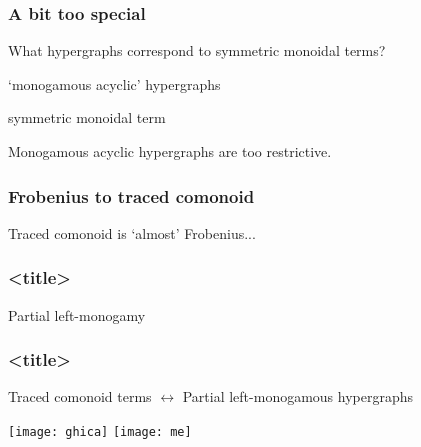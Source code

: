 \begin{frame}
    \frametitle{A bit too special}

    \centering

    What hypergraphs correspond to \alert{symmetric monoidal} terms?

    \vspace{1em}

    \begin{minipage}{0.45\textwidth}
        \begin{center}
            `monogamous acyclic' hypergraphs

            \vspace{1em}

        \end{center}
    \end{minipage}
    \quad
    \raisebox{-1em}{\(\leftrightarrow\)}
    \pause
    \begin{minipage}{0.45\textwidth}
        \begin{center}
            symmetric monoidal term

            \vspace{1em}

        \end{center}
    \end{minipage}

    \vspace{1em}
    \pause
    \normalsize
    \scalebox{0.75}{\hypergraphpeople}

    \vspace{0.5em}
    \Large
    \pause

    Monogamous acyclic hypergraphs are \alert{too restrictive}.

\end{frame}

\begin{frame}
    \frametitle{Frobenius to traced comonoid}

    \centering
    \LARGE
    Traced comonoid is `almost' Frobenius...


\end{frame}

\begin{frame}
    \frametitle{<title>}

    Partial left-monogamy

\end{frame}

\begin{frame}
    \frametitle{<title>}

    Traced comonoid terms
    \(\leftrightarrow\)
    Partial left-monogamous hypergraphs

    \texttt{[image: ghica]}
    \texttt{[image: me]}

\end{frame}